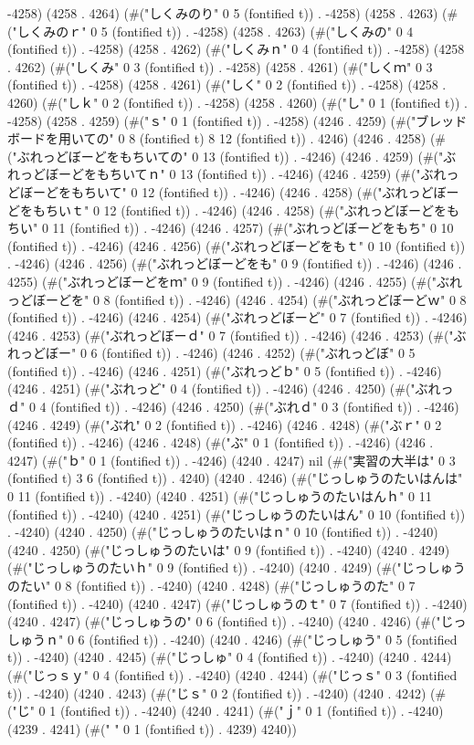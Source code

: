 -4258) (4258 . 4264) (#("しくみのり" 0 5 (fontified t)) . -4258) (4258 . 4263) (#("しくみのｒ" 0 5 (fontified t)) . -4258) (4258 . 4263) (#("しくみの" 0 4 (fontified t)) . -4258) (4258 . 4262) (#("しくみｎ" 0 4 (fontified t)) . -4258) (4258 . 4262) (#("しくみ" 0 3 (fontified t)) . -4258) (4258 . 4261) (#("しくｍ" 0 3 (fontified t)) . -4258) (4258 . 4261) (#("しく" 0 2 (fontified t)) . -4258) (4258 . 4260) (#("しｋ" 0 2 (fontified t)) . -4258) (4258 . 4260) (#("し" 0 1 (fontified t)) . -4258) (4258 . 4259) (#("ｓ" 0 1 (fontified t)) . -4258) (4246 . 4259) (#("ブレッドボードを用いての" 0 8 (fontified t) 8 12 (fontified t)) . 4246) (4246 . 4258) (#("ぶれっどぼーどをもちいての" 0 13 (fontified t)) . -4246) (4246 . 4259) (#("ぶれっどぼーどをもちいてｎ" 0 13 (fontified t)) . -4246) (4246 . 4259) (#("ぶれっどぼーどをもちいて" 0 12 (fontified t)) . -4246) (4246 . 4258) (#("ぶれっどぼーどをもちいｔ" 0 12 (fontified t)) . -4246) (4246 . 4258) (#("ぶれっどぼーどをもちい" 0 11 (fontified t)) . -4246) (4246 . 4257) (#("ぶれっどぼーどをもち" 0 10 (fontified t)) . -4246) (4246 . 4256) (#("ぶれっどぼーどをもｔ" 0 10 (fontified t)) . -4246) (4246 . 4256) (#("ぶれっどぼーどをも" 0 9 (fontified t)) . -4246) (4246 . 4255) (#("ぶれっどぼーどをｍ" 0 9 (fontified t)) . -4246) (4246 . 4255) (#("ぶれっどぼーどを" 0 8 (fontified t)) . -4246) (4246 . 4254) (#("ぶれっどぼーどｗ" 0 8 (fontified t)) . -4246) (4246 . 4254) (#("ぶれっどぼーど" 0 7 (fontified t)) . -4246) (4246 . 4253) (#("ぶれっどぼーｄ" 0 7 (fontified t)) . -4246) (4246 . 4253) (#("ぶれっどぼー" 0 6 (fontified t)) . -4246) (4246 . 4252) (#("ぶれっどぼ" 0 5 (fontified t)) . -4246) (4246 . 4251) (#("ぶれっどｂ" 0 5 (fontified t)) . -4246) (4246 . 4251) (#("ぶれっど" 0 4 (fontified t)) . -4246) (4246 . 4250) (#("ぶれっｄ" 0 4 (fontified t)) . -4246) (4246 . 4250) (#("ぶれｄ" 0 3 (fontified t)) . -4246) (4246 . 4249) (#("ぶれ" 0 2 (fontified t)) . -4246) (4246 . 4248) (#("ぶｒ" 0 2 (fontified t)) . -4246) (4246 . 4248) (#("ぶ" 0 1 (fontified t)) . -4246) (4246 . 4247) (#("ｂ" 0 1 (fontified t)) . -4246) (4240 . 4247) nil (#("実習の大半は" 0 3 (fontified t) 3 6 (fontified t)) . 4240) (4240 . 4246) (#("じっしゅうのたいはんは" 0 11 (fontified t)) . -4240) (4240 . 4251) (#("じっしゅうのたいはんｈ" 0 11 (fontified t)) . -4240) (4240 . 4251) (#("じっしゅうのたいはん" 0 10 (fontified t)) . -4240) (4240 . 4250) (#("じっしゅうのたいはｎ" 0 10 (fontified t)) . -4240) (4240 . 4250) (#("じっしゅうのたいは" 0 9 (fontified t)) . -4240) (4240 . 4249) (#("じっしゅうのたいｈ" 0 9 (fontified t)) . -4240) (4240 . 4249) (#("じっしゅうのたい" 0 8 (fontified t)) . -4240) (4240 . 4248) (#("じっしゅうのた" 0 7 (fontified t)) . -4240) (4240 . 4247) (#("じっしゅうのｔ" 0 7 (fontified t)) . -4240) (4240 . 4247) (#("じっしゅうの" 0 6 (fontified t)) . -4240) (4240 . 4246) (#("じっしゅうｎ" 0 6 (fontified t)) . -4240) (4240 . 4246) (#("じっしゅう" 0 5 (fontified t)) . -4240) (4240 . 4245) (#("じっしゅ" 0 4 (fontified t)) . -4240) (4240 . 4244) (#("じっｓｙ" 0 4 (fontified t)) . -4240) (4240 . 4244) (#("じっｓ" 0 3 (fontified t)) . -4240) (4240 . 4243) (#("じｓ" 0 2 (fontified t)) . -4240) (4240 . 4242) (#("じ" 0 1 (fontified t)) . -4240) (4240 . 4241) (#("ｊ" 0 1 (fontified t)) . -4240) (4239 . 4241) (#(" " 0 1 (fontified t)) . 4239) 4240))
